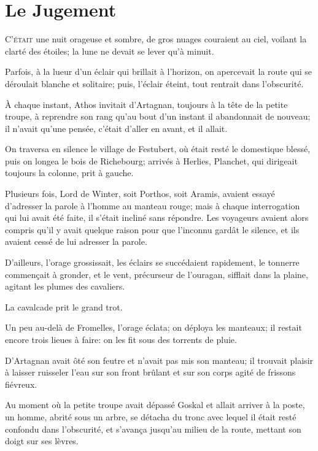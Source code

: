 
\chapter{Le Jugement} 
	
\lettrine{C}{'était} une nuit orageuse et sombre, de gros nuages couraient au ciel, voilant la clarté des étoiles; la lune ne devait se lever qu'à minuit. 

\zz
Parfois, à la lueur d'un éclair qui brillait à l'horizon, on apercevait la route qui se déroulait blanche et solitaire; puis, l'éclair éteint, tout rentrait dans l'obscurité. 

À chaque instant, Athos invitait d'Artagnan, toujours à la tête de la petite troupe, à reprendre son rang qu'au bout d'un instant il abandonnait de nouveau; il n'avait qu'une pensée, c'était d'aller en avant, et il allait. 

On traversa en silence le village de Festubert, où était resté le domestique blessé, puis on longea le bois de Richebourg; arrivés à Herlies, Planchet, qui dirigeait toujours la colonne, prit à gauche. 

Plusieurs fois, Lord de Winter, soit Porthos, soit Aramis, avaient essayé d'adresser la parole à l'homme au manteau rouge; mais à chaque interrogation qui lui avait été faite, il s'était incliné sans répondre. Les voyageurs avaient alors compris qu'il y avait quelque raison pour que l'inconnu gardât le silence, et ils avaient cessé de lui adresser la parole. 

D'ailleurs, l'orage grossissait, les éclairs se succédaient rapidement, le tonnerre commençait à gronder, et le vent, précurseur de l'ouragan, sifflait dans la plaine, agitant les plumes des cavaliers. 

La cavalcade prit le grand trot. 

Un peu au-delà de Fromelles, l'orage éclata; on déploya les manteaux; il restait encore trois lieues à faire: on les fit sous des torrents de pluie. 

D'Artagnan avait ôté son feutre et n'avait pas mis son manteau; il trouvait plaisir à laisser ruisseler l'eau sur son front brûlant et sur son corps agité de frissons fiévreux. 

Au moment où la petite troupe avait dépassé Goskal et allait arriver à la poste, un homme, abrité sous un arbre, se détacha du tronc avec lequel il était resté confondu dans l'obscurité, et s'avança jusqu'au milieu de la route, mettant son doigt sur ses lèvres. 

